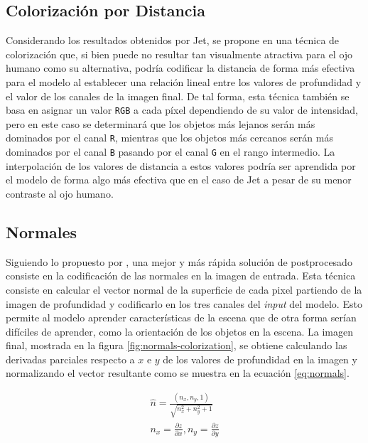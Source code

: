 \documentclass[12pt,a4paper]{report}
\begin{document}
\subsection{Colorización por Distancia}
Considerando los resultados obtenidos por Jet, se propone en una técnica de colorización que, si bien puede no resultar tan visualmente atractiva para el ojo humano como su alternativa, podría codificar la distancia de forma más efectiva para el modelo al establecer una relación lineal entre los valores de profundidad y el valor de los canales de la imagen final. De tal forma, esta técnica también se basa en asignar un valor \texttt{RGB} a cada píxel dependiendo de su valor de intensidad, pero en este caso se determinará que los objetos más lejanos serán más dominados por el canal \texttt{R}, mientras que los objetos más cercanos serán más dominados por el canal \texttt{B} pasando por el canal \texttt{G} en el rango intermedio. La interpolación de los valores de distancia a estos valores podría ser aprendida por el modelo de forma algo más efectiva que en el caso de Jet a pesar de su menor contraste al ojo humano.

\subsection{Normales}
\label{subsubsec:normals}
Siguiendo lo propuesto por \cite{eitel2015multimodaldeeplearningrobust}, una mejor y más rápida solución de postprocesado consiste en la codificación de las normales en la imagen de entrada. Esta técnica consiste en calcular el vector normal de la superficie de cada pixel partiendo de la imagen de profundidad y codificarlo en los tres canales del \textit{input} del modelo. Esto permite al modelo aprender características de la escena que de otra forma serían difíciles de aprender, como la orientación de los objetos en la escena. La imagen final, mostrada en la figura \ref{fig:normals-colorization}, se obtiene calculando las derivadas parciales respecto a $x$ e $y$ de los valores de profundidad en la imagen y normalizando el vector resultante como se muestra en la ecuación \ref{eq:normals}.

\begin{equation}
    \begin{aligned}
        \hat{n} = \frac{(n_x, n_y, 1)}{\sqrt{n_x^2 + n_y^2 + 1}} \\
        n_x = \frac{\partial z}{\partial x}, n_y = \frac{\partial z}{\partial y} 
    \end{aligned}
    \label{eq:normals}
\end{equation}
\end{document}
